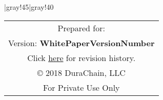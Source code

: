 \def\WhitePaperVersionNumber{unknown revision}
\vfill
\begin{center}
\tabulinesep=2mm
  \taburulecolor |{gray!45}|{gray!40} \arrayrulewidth=1pt
\begin{tabu}{||c||}
  \hline \hline
  Prepared for: \\
  \small{Version:} \textbf{WhitePaperVersionNumber} \\
	\small
  Click {\href{https://github.com/durachain/whitepaper/commits/master}{here} for revision history.} \\
  \copyright\hspace{.25em} 2018 DuraChain, LLC\\
  For Private Use Only \\ \hline \hline
\end{tabu}

\end{center}
\vfill
